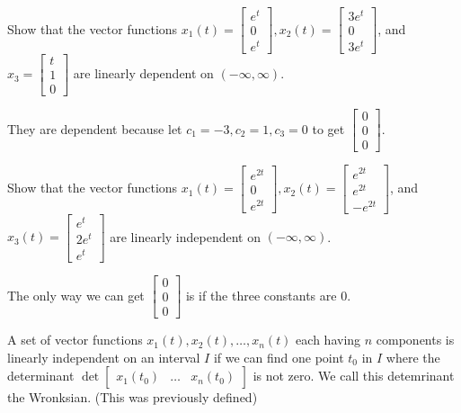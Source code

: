 \documentclass[../diffeq.tex]{subfiles}
\begin{document}
\begin{example}
    Show that the vector functions $x_1(t)=\begin{bmatrix}
        e^t\\0\\e^t
    \end{bmatrix}, x_2(t)=\begin{bmatrix}
        3e^t\\0\\3e^t
    \end{bmatrix}$, and $x_3=\begin{bmatrix}
        t\\1\\0
    \end{bmatrix}$ are linearly dependent on $(-\infty,\infty)$.

    They are dependent because let $c_1=-3, c_2=1, c_3=0$ to get $\begin{bmatrix}
        0\\0\\0
    \end{bmatrix}$.
\end{example}

\begin{example}
    Show that the vector functions $x_1(t)=\begin{bmatrix}
        e^{2t}\\0\\e^{2t}
    \end{bmatrix}, x_2(t)=\begin{bmatrix}
        e^{2t}\\e^{2t}\\-e^{2t}
    \end{bmatrix}$, and $x_3(t)=\begin{bmatrix}
        e^t\\2e^t\\e^t
    \end{bmatrix}$ are linearly independent on $(-\infty,\infty)$.

    The only way we can get $\begin{bmatrix}
        0\\0\\0
    \end{bmatrix}$ is if the three constants are $0$.
\end{example}

A set of vector functions $x_1(t),x_2(t),\dots, x_n(t)$ each having $n$ components is linearly independent on an interval $I$ if we can find one point $t_0$ in $I$ where the determinant 
$\det \begin{bmatrix}
    x_1(t_0) & \dots & x_n(t_0)
\end{bmatrix}$ is not zero. We call this detemrinant the Wronksian. (This was previously defined)
\end{document}
